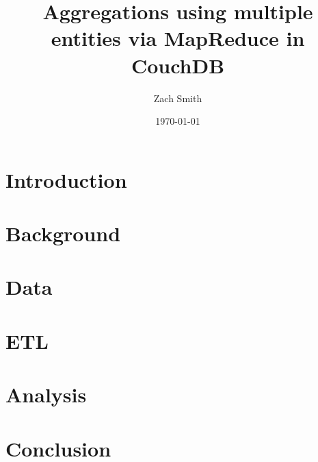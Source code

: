 \documentclass[
    parskip=full,
    a4paper
]{report}
\title{Aggregations using multiple entities via MapReduce in CouchDB}
\author{Zach Smith}
\date{\today}
\begin{document}
\maketitle
\thispagestyle{empty}

\begin{abstract}
    
\end{abstract}
\newpage

\tableofcontents
\newpage
\listoffigures
\newpage
\listoftables
\newpage

\chapter{Introduction}


\chapter{Background}






\chapter{Data}
\label{chapter:data}


\chapter{ETL}




\chapter{Analysis}






\chapter{Conclusion}




\newpage



\end{document}
